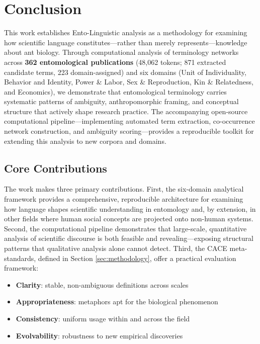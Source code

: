 \documentclass[
]{article}
\providecommand{\tightlist}{%
  \setlength{\itemsep}{0pt}\setlength{\parskip}{0pt}}
\numberwithin{equation}{section}
\begin{document}
\newpage

\section{Conclusion}\label{sec:conclusion}

This work establishes Ento-Linguistic analysis as a methodology for
examining how scientific language constitutes---rather than merely
represents---knowledge about ant biology. Through computational analysis
of terminology networks across \textbf{362 entomological publications}
(48,062 tokens; 871 extracted candidate terms, 223 domain-assigned) and
six domains (Unit of Individuality, Behavior and Identity, Power \&
Labor, Sex \& Reproduction, Kin \& Relatedness, and Economics), we
demonstrate that entomological terminology carries systematic patterns
of ambiguity, anthropomorphic framing, and conceptual structure that
actively shape research practice. The accompanying open-source
computational pipeline---implementing automated term extraction,
co-occurrence network construction, and ambiguity scoring---provides a
reproducible toolkit for extending this analysis to new corpora and
domains.

\subsection{Core Contributions}\label{core-contributions}

The work makes three primary contributions. First, the six-domain
analytical framework provides a comprehensive, reproducible architecture
for examining how language shapes scientific understanding in entomology
and, by extension, in other fields where human social concepts are
projected onto non-human systems. Second, the computational pipeline
demonstrates that large-scale, quantitative analysis of scientific
discourse is both feasible and revealing---exposing structural patterns
that qualitative analysis alone cannot detect. Third, the CACE
meta-standards, defined in Section \ref{sec:methodology}, offer a
practical evaluation framework:

\begin{itemize}
\tightlist
\item
  \textbf{Clarity}: stable, non-ambiguous definitions across scales
\item
  \textbf{Appropriateness}: metaphors apt for the biological phenomenon
\item
  \textbf{Consistency}: uniform usage within and across the field
\item
  \textbf{Evolvability}: robustness to new empirical discoveries
\end{itemize}
\end{document}
